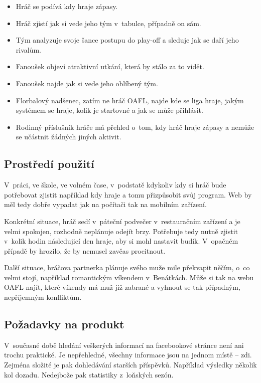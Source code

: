 \documentclass[11pt, a4paper, titlepage]{article}
\begin{document}
\begin{itemize}
    \item Hráč se podívá kdy hraje zápasy.
    \item Hráč zjistí jak si vede jeho tým v~tabulce, případně on sám.
    \item Tým analyzuje svoje šance postupu do play-off a sleduje jak se daří jeho rivalům.
    \item Fanoušek objeví atraktivní utkání, která by stálo za to vidět.
    \item Fanoušek najde jak si vede jeho oblíbený tým.
    \item Florbalový nadšenec, zatím ne hráč OAFL, najde kde se liga hraje, jakým systémem se hraje, kolik je startovné a jak se může přihlásit.
    \item Rodinný příslušník hráče má přehled o~tom, kdy hráč hraje zápasy a nemůže se učástnit žádných jiných aktivit.
\end{itemize}

\subsection{Prostředí použití}

V~práci, ve škole, ve volném čase, v~podstatě kdykoliv kdy si hráč bude potřebovat zjistit například kdy hraje a tomu přizpůsobit svůj program. Web by měl tedy dobře vypadat jak na počítači tak na mobilním zařízení.
\bigskip

Konkrétní situace, hráč sedí v~páteční podvečer v~restauračním zařízení a je velmi spokojen, rozhodně neplánuje odejít brzy. Potřebuje tedy nutně zjistit v~kolik hodin následujicí den hraje, aby si mohl nastavit budík. V~opačném případě by hrozilo, že by nemusel zavčas procitnout.
\bigskip

Další situace, hráčova partnerka plánuje svého muže mile překvapit něčím, o~co velmi stojí, například romantickým víkendem v~Benátkách. Může si tak na webu OAFL najít, které víkendy má muž již zabrané a vyhnout se tak případným, nepříjemným konfliktům.

\subsection{Požadavky na produkt}

V~současné době hledání veškerých informací na facebookové stránce není ani trochu praktické. Je nepřehledné, všechny informace jsou na jednom místě -- zdi. Zejména složité je pak dohledávání starších příspěvků. Například výsledky několik kol dozadu. Nedejbože pak statistiky z~loňských sezón.
\bigskip
\end{document}
